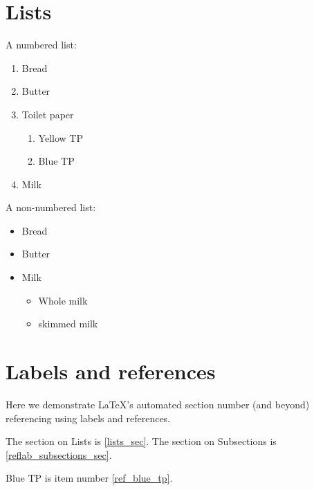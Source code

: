 \documentclass{article}
\begin{document}
  \section{Lists \label{lists_sec}}

    A numbered list:
    \begin{enumerate}
      \item Bread
      \item Butter
      \item Toilet paper
        \begin{enumerate}
          \item Yellow TP
          \item Blue TP \label{ref_blue_tp}
        \end{enumerate}
      \item Milk
    \end{enumerate}

    A non-numbered list:
    \begin{itemize}
      \item Bread
      \item Butter
      \item Milk
        \begin{itemize}
          \item Whole milk 
          \item skimmed milk
        \end{itemize}
    \end{itemize}
  

    \section{Labels and references}

    Here we demonstrate LaTeX's automated section number (and beyond) referencing using labels and references.

    The section on Lists is \ref{lists_sec}. The section on Subsections is \ref{reflab_subsections_sec}.

    Blue TP is item number \ref{ref_blue_tp}. 
\end{document}

